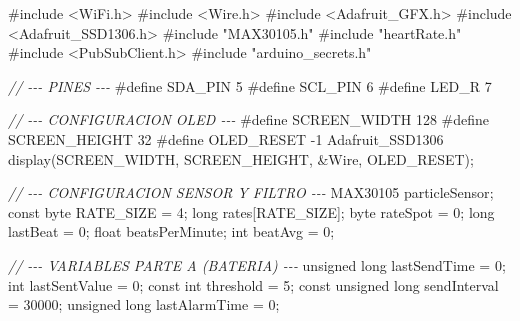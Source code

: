 \documentclass[11pt]{article}
\newenvironment{Shaded}{}{}
\newcommand{\DataTypeTok}[1]{\textcolor[rgb]{0.56,0.13,0.00}{{#1}}}
\newcommand{\DecValTok}[1]{\textcolor[rgb]{0.25,0.63,0.44}{{#1}}}
\newcommand{\CommentTok}[1]{\textcolor[rgb]{0.38,0.63,0.69}{\textit{{#1}}}}
\newcommand{\NormalTok}[1]{{#1}}
\newcommand{\ImportTok}[1]{{#1}}
\newcommand{\OperatorTok}[1]{\textcolor[rgb]{0.40,0.40,0.40}{{#1}}}
\newcommand{\PreprocessorTok}[1]{\textcolor[rgb]{0.74,0.48,0.00}{{#1}}}
\begin{document}
\begin{Shaded}
\begin{Highlighting}[]
\PreprocessorTok{\#include }\ImportTok{\textless{}WiFi.h\textgreater{}}
\PreprocessorTok{\#include }\ImportTok{\textless{}Wire.h\textgreater{}}
\PreprocessorTok{\#include }\ImportTok{\textless{}Adafruit\_GFX.h\textgreater{}}
\PreprocessorTok{\#include }\ImportTok{\textless{}Adafruit\_SSD1306.h\textgreater{}}
\PreprocessorTok{\#include }\ImportTok{"MAX30105.h"}
\PreprocessorTok{\#include }\ImportTok{"heartRate.h"}
\PreprocessorTok{\#include }\ImportTok{\textless{}PubSubClient.h\textgreater{}}
\PreprocessorTok{\#include }\ImportTok{"arduino\_secrets.h"}

\CommentTok{// {-}{-}{-} PINES {-}{-}{-}}
\PreprocessorTok{\#define SDA\_PIN }\DecValTok{5}
\PreprocessorTok{\#define SCL\_PIN }\DecValTok{6}
\PreprocessorTok{\#define LED\_R }\DecValTok{7}

\CommentTok{// {-}{-}{-} CONFIGURACION OLED {-}{-}{-}}
\PreprocessorTok{\#define SCREEN\_WIDTH }\DecValTok{128}
\PreprocessorTok{\#define SCREEN\_HEIGHT }\DecValTok{32}
\PreprocessorTok{\#define OLED\_RESET }\OperatorTok{{-}}\DecValTok{1}
\NormalTok{Adafruit\_SSD1306 display}\OperatorTok{(}\NormalTok{SCREEN\_WIDTH}\OperatorTok{,}\NormalTok{ SCREEN\_HEIGHT}\OperatorTok{,} \OperatorTok{\&}\NormalTok{Wire}\OperatorTok{,}\NormalTok{ OLED\_RESET}\OperatorTok{);}

\CommentTok{// {-}{-}{-} CONFIGURACION SENSOR Y FILTRO {-}{-}{-}}
\NormalTok{MAX30105 particleSensor}\OperatorTok{;}
\DataTypeTok{const}\NormalTok{ byte RATE\_SIZE }\OperatorTok{=} \DecValTok{4}\OperatorTok{;}
\DataTypeTok{long}\NormalTok{ rates}\OperatorTok{[}\NormalTok{RATE\_SIZE}\OperatorTok{];}
\NormalTok{byte rateSpot }\OperatorTok{=} \DecValTok{0}\OperatorTok{;}
\DataTypeTok{long}\NormalTok{ lastBeat }\OperatorTok{=} \DecValTok{0}\OperatorTok{;}
\DataTypeTok{float}\NormalTok{ beatsPerMinute}\OperatorTok{;}
\DataTypeTok{int}\NormalTok{ beatAvg }\OperatorTok{=} \DecValTok{0}\OperatorTok{;}

\CommentTok{// {-}{-}{-} VARIABLES PARTE A (BATERIA) {-}{-}{-}}
\DataTypeTok{unsigned} \DataTypeTok{long}\NormalTok{ lastSendTime }\OperatorTok{=} \DecValTok{0}\OperatorTok{;}
\DataTypeTok{int}\NormalTok{ lastSentValue }\OperatorTok{=} \DecValTok{0}\OperatorTok{;}
\DataTypeTok{const} \DataTypeTok{int}\NormalTok{ threshold }\OperatorTok{=} \DecValTok{5}\OperatorTok{;}
\DataTypeTok{const} \DataTypeTok{unsigned} \DataTypeTok{long}\NormalTok{ sendInterval }\OperatorTok{=} \DecValTok{30000}\OperatorTok{;}
\DataTypeTok{unsigned} \DataTypeTok{long}\NormalTok{ lastAlarmTime }\OperatorTok{=} \DecValTok{0}\OperatorTok{;}


\end{Highlighting}
\end{Shaded}
\end{document}
